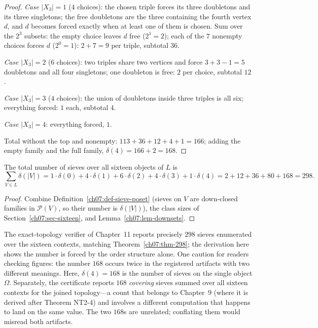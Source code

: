 \begin{proof}
\emph{Case $|X_{3}|=1$} ($4$ choices): the chosen triple forces its three doubletons and its three singletons; the free doubletons are the three containing the fourth vertex $d$, and $d$ becomes forced exactly when at least one of them is chosen. Sum over the $2^{3}$ subsets: the empty choice leaves $d$ free ($2^{1}=2$); each of the $7$ nonempty choices forces $d$ ($2^{0}=1$): $2+7=9$ per triple, subtotal $36$.

\emph{Case $|X_{3}|=2$} ($6$ choices): two triples share two vertices and force $3+3-1=5$ doubletons and all four singletons; one doubleton is free: $2$ per choice, subtotal $12$.

\emph{Case $|X_{3}|=3$} ($4$ choices): the union of doubletons inside three triples is all six; everything forced: $1$ each, subtotal $4$.

\emph{Case $|X_{3}|=4$}: everything forced, $1$.

Total without the top and nonempty: $113+36+12+4+1=166$; adding the empty family and the full family, $\delta(4)=166+2=168$.
\end{proof}

\begin{theorem}\label{ch07:thm-298}
The total number of sieves over all sixteen objects of $L$ is
\[
\sum_{V\in L}\delta(|V|)
=1\cdot\delta(0)+4\cdot\delta(1)+6\cdot\delta(2)+4\cdot\delta(3)+1\cdot\delta(4)
=2+12+36+80+168
=298 .
\]
\end{theorem}

\begin{proof}
Combine Definition~\ref{ch07:def-sieve-poset} (sieves on $V$ are down-closed families in $\mathcal{P}(V)$, so their number is $\delta(|V|)$), the class sizes of Section~\ref{ch07:sec-sixteen}, and Lemma~\ref{ch07:lem-downsets}.
\end{proof}

\begin{remark}\label{ch07:rem-298}
The exact-topology verifier of Chapter~11 reports precisely $298$ sieves enumerated over the sixteen contexts, matching Theorem~\ref{ch07:thm-298}; the derivation here shows the number is forced by the order structure alone. One caution for readers checking figures: the number $168$ occurs twice in the registered artifacts with two different meanings. Here, $\delta(4)=168$ is the number of sieves on the single object $\Omega$. Separately, the certificate reports $168$ \emph{covering} sieves summed over all sixteen contexts for the joined topology---a count that belongs to Chapter~9 (where it is derived after Theorem NT2-4) and involves a different computation that happens to land on the same value. The two $168$s are unrelated; conflating them would misread both artifacts.
\end{remark}

